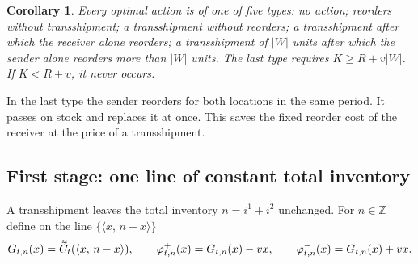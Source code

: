 \documentclass[11pt]{article}
\DeclareRobustCommand{\dbtilde}[1]{\accentset{\approx}{#1}}
\newcommand{\Z}{\mathbb{Z}}
\newcommand{\Cq}{\dbtilde{C}}
\newtheorem{corollary}{Corollary}
\theoremstyle{definition}
\begin{document}
\begin{corollary}\label{cor:types}
Every optimal action is of one of five types: no action; reorders without transshipment; a transshipment without reorders; a transshipment after which the receiver alone reorders; a transshipment of $|W|$ units after which the sender alone reorders more than $|W|$ units. The last type requires $K\ge R+v|W|$. If $K<R+v$, it never occurs.
\end{corollary}

In the last type the sender reorders for both locations in the same period. It passes on stock and replaces it at once. This saves the fixed reorder cost of the receiver at the price of a transshipment.

\subsection{First stage: one line of constant total inventory}

A transshipment leaves the total inventory $n=i^1+i^2$ unchanged. For $n\in\Z$ define on the line $\{\langle x,\,n-x\rangle\}$
\[
G_{t,n}(x)=\Cq_t(\langle x,\,n-x\rangle),\qquad \varphi^+_{t,n}(x)=G_{t,n}(x)-vx,\qquad \varphi^-_{t,n}(x)=G_{t,n}(x)+vx .
\]
\end{document}
